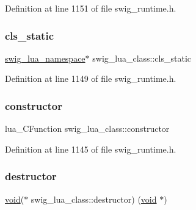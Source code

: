 Definition at line 1151 of file swig\+\_\+runtime.\+h.

\mbox{\label{structswig__lua__class_a41b17587e0b26e2112200adfffb22730}} 
\subsubsection{\texorpdfstring{cls\+\_\+static}{cls\_static}}
{\footnotesize\ttfamily \mbox{\hyperlink{structswig__lua__namespace}{swig\+\_\+lua\+\_\+namespace}}$\ast$ swig\+\_\+lua\+\_\+class\+::cls\+\_\+static}



Definition at line 1149 of file swig\+\_\+runtime.\+h.

\mbox{\label{structswig__lua__class_aac6eb9dc9a5e0b5f2c9d31a97ce0282e}} 
\subsubsection{\texorpdfstring{constructor}{constructor}}
{\footnotesize\ttfamily lua\+\_\+\+C\+Function swig\+\_\+lua\+\_\+class\+::constructor}



Definition at line 1145 of file swig\+\_\+runtime.\+h.

\mbox{\label{structswig__lua__class_a19ebe1411a51b4d1ef82432e76353854}} 
\subsubsection{\texorpdfstring{destructor}{destructor}}
{\footnotesize\ttfamily \mbox{\hyperlink{_thread_8h_af1e856da2e658414cb2456cb6f7ebc66}{void}}($\ast$ swig\+\_\+lua\+\_\+class\+::destructor) (\mbox{\hyperlink{_thread_8h_af1e856da2e658414cb2456cb6f7ebc66}{void}} $\ast$)}



